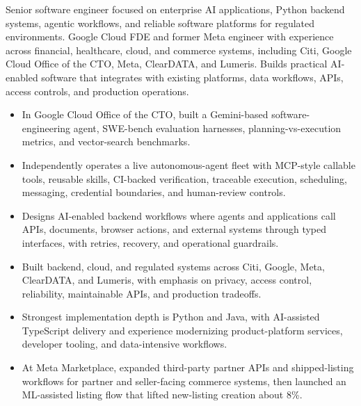 


Senior software engineer focused on enterprise AI applications, Python backend systems, agentic workflows, and reliable software platforms for regulated environments. Google Cloud FDE and former Meta engineer with experience across financial, healthcare, cloud, and commerce systems, including Citi, Google Cloud Office of the CTO, Meta, ClearDATA, and Lumeris. Builds practical AI-enabled software that integrates with existing platforms, data workflows, APIs, access controls, and production operations.
\begin{itemize}
  \item In Google Cloud Office of the CTO, built a Gemini-based software-engineering agent, SWE-bench evaluation harnesses, planning-vs-execution metrics, and vector-search benchmarks.
  \item Independently operates a live autonomous-agent fleet with MCP-style callable tools, reusable skills, CI-backed verification, traceable execution, scheduling, messaging, credential boundaries, and human-review controls.
  \item Designs AI-enabled backend workflows where agents and applications call APIs, documents, browser actions, and external systems through typed interfaces, with retries, recovery, and operational guardrails.
\end{itemize}
\begin{itemize}
  \item Built backend, cloud, and regulated systems across Citi, Google, Meta, ClearDATA, and Lumeris, with emphasis on privacy, access control, reliability, maintainable APIs, and production tradeoffs.
  \item Strongest implementation depth is Python and Java, with AI-assisted TypeScript delivery and experience modernizing product-platform services, developer tooling, and data-intensive workflows.
  \item At Meta Marketplace, expanded third-party partner APIs and shipped-listing workflows for partner and seller-facing commerce systems, then launched an ML-assisted listing flow that lifted new-listing creation about 8\%.
\end{itemize}




